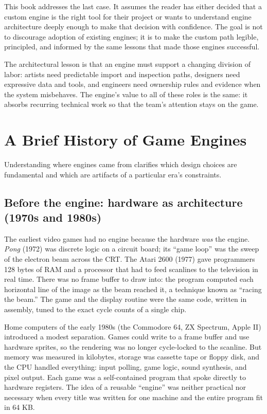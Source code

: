 \documentclass[
  11pt,
  letterpaper,
  DIV=11,
  numbers=noendperiod,
  twoside,
  open=right]{scrreprt}
\begin{document}
This book addresses the last case. It assumes the reader has either
decided that a custom engine is the right tool for their project or
wants to understand engine architecture deeply enough to make that
decision with confidence. The goal is not to discourage adoption of
existing engines; it is to make the custom path legible, principled, and
informed by the same lessons that made those engines successful.

The architectural lesson is that an engine must support a changing
division of labor: artists need predictable import and inspection paths,
designers need expressive data and tools, and engineers need ownership
rules and evidence when the system misbehaves. The engine's value to all
of these roles is the same: it absorbs recurring technical work so that
the team's attention stays on the game.

\section{A Brief History of Game
Engines}\label{a-brief-history-of-game-engines}

Understanding where engines came from clarifies which design choices are
fundamental and which are artifacts of a particular era's constraints.

\subsection{Before the engine: hardware as architecture (1970s and
1980s)}\label{before-the-engine-hardware-as-architecture-1970s-and-1980s}

The earliest video games had no engine because the hardware \emph{was}
the engine. \emph{Pong} (1972) was discrete logic on a circuit board;
its ``game loop'' was the sweep of the electron beam across the CRT. The
Atari 2600 (1977) gave programmers 128 bytes of RAM and a processor that
had to feed scanlines to the television in real time. There was no frame
buffer to draw into: the program computed each horizontal line of the
image as the beam reached it, a technique known as ``racing the beam.''
The game and the display routine were the same code, written in
assembly, tuned to the exact cycle counts of a single chip.

Home computers of the early 1980s (the Commodore 64, ZX Spectrum, Apple
II) introduced a modest separation. Games could write to a frame buffer
and use hardware sprites, so the rendering was no longer cycle-locked to
the scanline. But memory was measured in kilobytes, storage was cassette
tape or floppy disk, and the CPU handled everything: input polling, game
logic, sound synthesis, and pixel output. Each game was a self-contained
program that spoke directly to hardware registers. The idea of a
reusable ``engine'' was neither practical nor necessary when every title
was written for one machine and the entire program fit in 64 KB.
\end{document}
